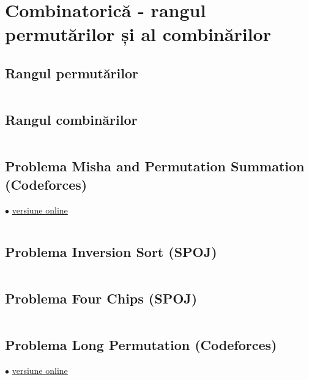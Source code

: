 \documentclass[../main.tex]{subfiles}
\begin{document}
\chapter{Combinatorică - rangul permutărilor și al combinărilor}

\section{Rangul permutărilor}
\label{code:math-perm-rank}

\inputminted{cpp}{../src/math/perm-rank.cpp}

\section{Rangul combinărilor}
\label{code:math-comb-rank}

\inputminted{cpp}{../src/math/comb-rank.cpp}

\section{Problema Misha and Permutation Summation (Codeforces)}
\label{code:misha-and-permutation-summation}
$\bullet$
\href{https://codeforces.com/contest/504/submission/304267338}{versiune online}

\inputminted{cpp}{../src/math/misha-and-permutation-summation.cpp}

\section{Problema Inversion Sort (SPOJ)}
\label{code:inversion-sort}

\inputminted{cpp}{../src/math/inversion-sort.cpp}

\section{Problema Four Chips (SPOJ)}
\label{code:four-chips}

\inputminted{cpp}{../src/math/four-chips.cpp}

\section{Problema Long Permutation (Codeforces)}
\label{code:long-permutation}
$\bullet$
\href{https://codeforces.com/contest/1443/submission/304869033}{versiune online}
\end{document}
